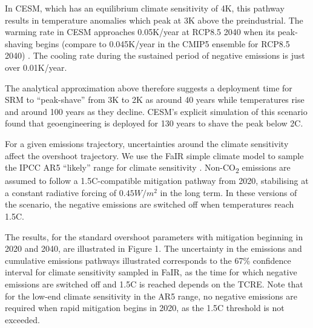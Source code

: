 \documentclass[draft]{agujournal2019}
\begin{document}
\medskip

In CESM, which has an equilibrium climate sensitivity of 4K, this pathway results in temperature anomalies which peak at 3K above the preindustrial. The warming rate in CESM approaches 0.05K/year at RCP8.5 2040 when its peak-shaving begins (compare to 0.045K/year in the CMIP5 ensemble for RCP8.5 2040) \cite{risbey2017transient}. The cooling rate during the sustained period of negative emissions is just over 0.01K/year.   


\medskip

The analytical approximation above therefore suggests a deployment time for SRM to “peak-shave” from 3K to 2K as around 40 years while temperatures rise and around 100 years as they decline. CESM's explicit simulation of this scenario found that geoengineering is deployed for 130 years to shave the peak below 2C. 

\medskip

For a given emissions trajectory, uncertainties around the climate sensitivity affect the overshoot trajectory. We use the FaIR simple climate model \cite{smith2018FaIR} to sample the IPCC AR5 “likely” range for climate sensitivity \cite{stocker2013climate}. Non-CO\textsubscript{2} emissions are assumed to follow a 1.5C-compatible mitigation pathway from 2020, stabilising at a constant radiative forcing of $ 0.45W/m^{2} $ in the long term. In these versions of the scenario, the negative emissions are switched off when temperatures reach 1.5C. 

\medskip

The results, for the standard overshoot parameters with mitigation beginning in 2020 and 2040, are illustrated in Figure 1. The uncertainty in the emissions and cumulative emissions pathways illustrated corresponds to the 67\% confidence interval for climate sensitivity sampled in FaIR, as the time for which negative emissions are switched off and 1.5C is reached depends on the TCRE. Note that for the low-end climate sensitivity in the AR5 range, no negative emissions are required when rapid mitigation begins in 2020, as the 1.5C threshold is not exceeded. 
\end{document}
